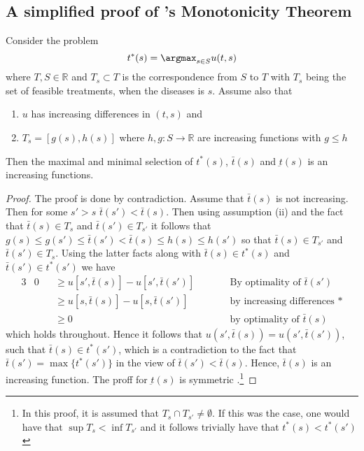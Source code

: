 \begin{appendices}
\subsection[A simplified proof of Topkis’s Monotonicity Theorem is]{A simplified proof of 's Monotonicity Theorem}\label{app:topiks-proof}
\begin{theorem}
	Consider the problem
	\[
		t^*(s)=\argmax_{s\in S} u(t,s)
	\]
	where $T,S\in \mathbb{R}$ and $T_s\subset T$ is the correspondence from $S$ to $T$  with $T_s$ being the set of feasible treatments, when the diseases is $s$.  Assume also that
	\begin{enumerate}[label=(\roman*)]
		\item $u$ has increasing differences in $(t,s)$  and
		\item $T_s=[g(s),h(s)]$  where $h,g:S \rightarrow \mathbb{R}$ are increasing functions with $g\leq h$
	\end{enumerate}
	Then the maximal and minimal selection of $t^*(s)$, $\bar{t}(s)$ and $\underbar{t}(s)$ is an increasing functions.
\end{theorem}

\begin{proof}
	The proof is done by contradiction. Assume that $\bar{t}(s)$ is not increasing. Then for some $s'>s$  $\bar{t}(s')<\bar{t}(s)$.  Then using assumption (ii) and the fact that $\bar{t}(s)\in T_s$  and $\bar{t}(s')\in T_{s'}$  it follows that $g(s)\leq g(s')\leq \bar{t}(s') < \bar{t}(s) \leq h(s) \leq h(s')$  so that $\bar{t}(s)\in T_{s'}$ and $\bar{t}(s')\in T_s$.  Using the latter facts along with $\bar{t}(s)\in t^*(s)$ and $\bar{t}(s')\in t^*(s')$  we have
	\begin{alignat*}{3}
	   & 0 && \geq u[s',\bar{t}(s)]-u[s',\bar{t}(s')] && \qquad \text{By optimality of } \bar{t}(s') \\
	   &   && \geq u[s,\bar{t}(s)]-u[s,\bar{t}(s')]   && \qquad \text{by increasing differences *} \\
	   &   && \geq 0                                  && \qquad \text{by optimality of } \bar{t}(s)
	\end{alignat*}
	which holds throughout. Hence it follows that $u(s',\bar{t}(s))=u(s',\bar{t}(s'))$, such that $\bar{t}(s)\in t^*(s')$, which is a contradiction to the fact that $\bar{t}(s')=\max \{t^*(s')\}$ in the view of $\bar{t}(s')<\bar{t}(s)$.  Hence, $\bar{t}(s)$ is an increasing function. The proff for $\underbar{t}(s)$ is symmetric \parencite{Amir2005Supermodularity}.\footnote{In this proof, it is assumed that $T_s\cap T_{s'}\ne \emptyset$. If this was the case, one would have that $\sup T_s < \inf T_{s'}$ and it follows trivially have that $t^*(s)<t^*(s')$}
\end{proof}

\end{appendices}
